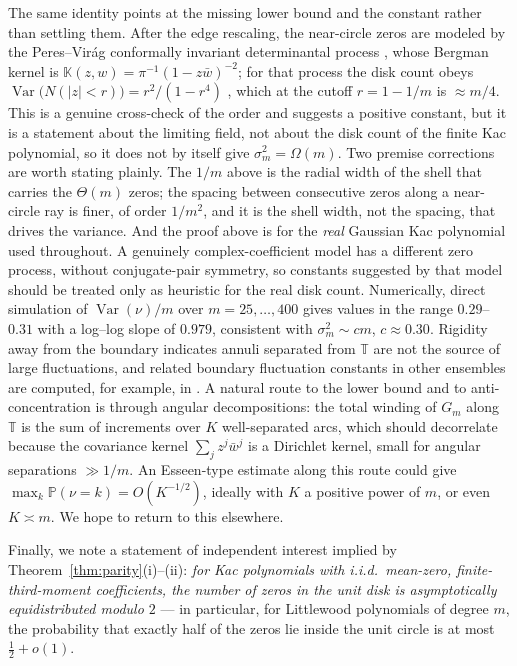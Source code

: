 \documentclass[11pt]{article}
\newcommand{\T}{\mathbb{T}}
\newcommand{\PP}{\mathbb{P}}
\begin{document}
The same identity points at the missing lower bound and the constant rather than
settling them.  After the edge rescaling, the near-circle zeros are modeled by the
Peres--Vir\'ag conformally invariant determinantal process
\cite{PV,HKPV}, whose Bergman kernel is
$\mathbb K(z,w)=\pi^{-1}(1-z\bar w)^{-2}$; for that process the disk count obeys
$\operatorname{Var}\bigl(N(|z|<r)\bigr)=r^2/(1-r^4)$ \cite{Buckley}, which at the
cutoff $r=1-1/m$ is $\approx m/4$.  This is a genuine cross-check of the order and
suggests a positive constant, but it is a statement about the limiting field, not
about the disk count of the finite Kac polynomial, so it does not by itself give
$\sigma_m^2=\Omega(m)$.  Two premise corrections are worth stating plainly.  The
$1/m$ above is the radial width of the shell that carries the $\Theta(m)$ zeros;
the spacing between consecutive zeros along a near-circle ray is finer, of order
$1/m^2$, and it is the shell width, not the spacing, that drives the variance.
And the proof above is for the \emph{real} Gaussian Kac polynomial used
throughout.  A genuinely complex-coefficient model has a different zero process,
without conjugate-pair symmetry, so constants suggested by that model should be
treated only as heuristic for the real disk count.  Numerically, direct simulation of
$\operatorname{Var}(\nu)/m$ over $m=25,\dots,400$ gives values in the range
$0.29$--$0.31$ with a log--log slope of $0.979$, consistent with
$\sigma_m^2\sim cm$, $c\approx0.30$.  Rigidity away from the boundary \cite{Yeager}
indicates annuli separated from $\T$ are not the source of large fluctuations, and
related boundary fluctuation constants in other ensembles are computed, for
example, in \cite{ACM}.  A natural route to the lower bound and to
anti-concentration is
through angular decompositions: the total winding of \(G_m\) along \(\T\) is the
sum of increments over \(K\) well-separated arcs, which should decorrelate because
the covariance kernel \(\sum_jz^j\bar w^j\) is a Dirichlet kernel, small for
angular separations \(\gg1/m\).  An Esseen-type estimate along this route could
give \(\max_k\PP(\nu=k)=O(K^{-1/2})\), ideally with \(K\) a positive power of
\(m\), or even \(K\asymp m\).  We hope to return to this elsewhere.

Finally, we note a statement of independent interest implied by
Theorem~\ref{thm:parity}(i)--(ii): \emph{for Kac polynomials with i.i.d.\
mean-zero, finite-third-moment coefficients, the number of zeros in the unit
disk is asymptotically equidistributed modulo $2$} --- in particular, for
Littlewood polynomials of degree $m$, the probability that exactly half of the
zeros lie inside the unit circle is at most $\tfrac12+o(1)$.
\end{document}
